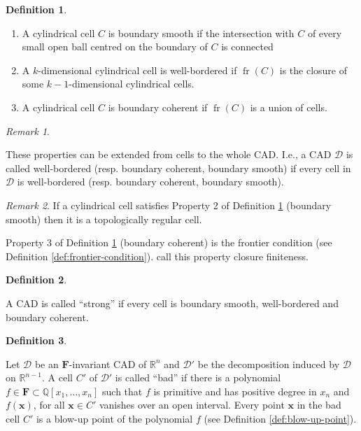 \documentclass[
]{book}
\providecommand{\tightlist}{%
  \setlength{\itemsep}{0pt}\setlength{\parskip}{0pt}}
\theoremstyle{definition}
\newtheorem{definition}{Definition}[chapter]
\theoremstyle{definition}
\theoremstyle{definition}
\theoremstyle{definition}
\theoremstyle{remark}
\newtheorem*{remark}{Remark}
\begin{document}
\begin{definition}
\protect\hypertarget{def:laz-properties}{}\label{def:laz-properties}

\citep[Definition 2.7]{lazard10}

\begin{enumerate}
\def\labelenumi{\arabic{enumi}.}
\tightlist
\item
  A cylindrical cell \(C\) is boundary smooth if the intersection with \(C\) of every small open ball centred on the boundary of \(C\) is connected
\item
  A \(k\)-dimensional cylindrical cell is well-bordered if \({\operatorname{fr} \left( C \right)}\) is the closure of some \(k-1\)-dimensional cylindrical cells.
\item
  A cylindrical cell \(C\) is boundary coherent if \({\operatorname{fr} \left( C \right)}\) is a union of cells.
\end{enumerate}

\end{definition}

\begin{remark}
\citep[Definition 2.7]{lazard10}

These properties can be extended from cells to the whole CAD. I.e., a CAD \(\mathcal{D}\) is called well-bordered (resp. boundary coherent, boundary smooth) if every cell in \(\mathcal{D}\) is well-bordered (resp. boundary coherent, boundary smooth).
\end{remark}

\begin{remark}
If a cylindrical cell satisfies Property 2 of Definition \ref{def:laz-properties} (boundary smooth) then it is a topologically regular cell.

Property 3 of Definition \ref{def:laz-properties} (boundary coherent) is the frontier condition (see Definition \ref{def:frontier-condition}).
\citet{jhd20} call this property closure finiteness.
\end{remark}

\begin{definition}
\citep[Definition 2.7]{lazard10}

A CAD is called ``strong'' if every cell is boundary smooth, well-bordered and boundary coherent.
\end{definition}

\begin{definition}
\citep[Definition 4.1]{lazard10}

Let \(\mathcal{D}\) be an \(\mathbf{F}\)-invariant CAD of \(\mathbb{R}^n\) and \(\mathcal{D'}\) be the decomposition induced by \(\mathcal{D}\) on \(\mathbb{R}^{n-1}\). A cell \(C'\) of \(\mathcal{D'}\) is called ``bad'' if there is a polynomial \(f \in \mathbf{F} \subset \mathbb{Q}[x_1,\ldots,x_n]\) such that \(f\) is primitive and has positive degree in \(x_n\) and \(f(\mathbf{x})\), for all \(\mathbf{x} \in C'\) vanishes over an open interval. Every point \(\mathbf{x}\) in the bad cell \(C'\) is a blow-up point of the polynomial \(f\) (see Definition \ref{def:blow-up-point}).
\end{definition}
\end{document}
